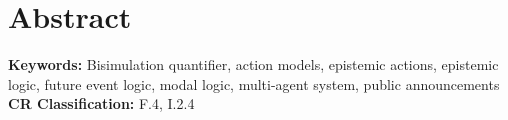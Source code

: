 \section{Abstract}

{\bf Keywords:} Bisimulation quantifier, action models, epistemic actions,
epistemic logic, future event logic, modal logic, multi-agent system, public
announcements\\
{\bf CR Classification:} F.4, I.2.4
